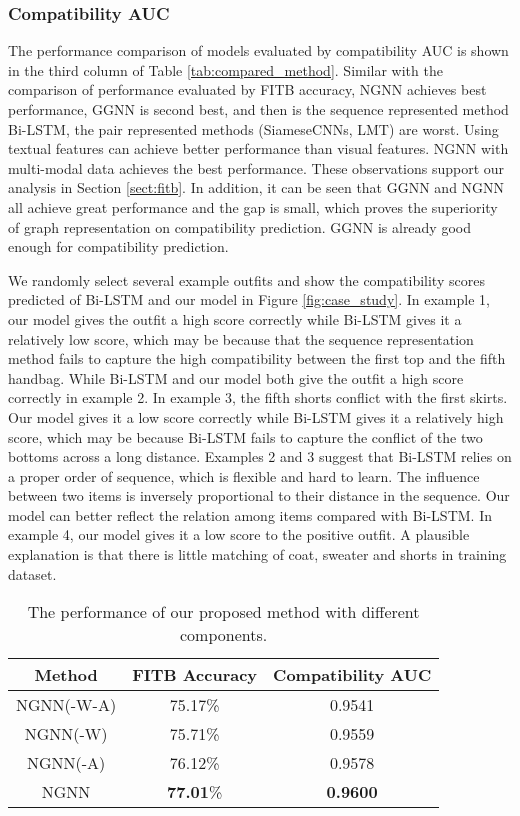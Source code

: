 \documentclass[sigconf]{acmart}
\begin{document}
\subsubsection{Compatibility AUC}
The performance comparison of models evaluated by compatibility AUC is shown in the third column of Table \ref{tab:compared_method}.
Similar with the comparison of performance evaluated by FITB accuracy, NGNN achieves best performance, GGNN is second best, and then is the sequence represented method Bi-LSTM, the pair represented methods (SiameseCNNs, LMT) are worst. Using textual features can achieve better performance than visual features. NGNN with multi-modal data achieves the best performance. These observations support our analysis in Section \ref{sect:fitb}.
In addition, it can be seen that GGNN and NGNN all achieve great performance and the gap is small, which proves the superiority of graph representation on compatibility prediction.
GGNN is already good enough for compatibility prediction.


We randomly select several example outfits and show the compatibility scores predicted of Bi-LSTM and our model in Figure \ref{fig:case_study}.
In example 1, our model gives the outfit a high score correctly while Bi-LSTM gives it a relatively low score, which may be because that the sequence representation method fails to capture the high compatibility between the first top and the fifth handbag.
While Bi-LSTM and our model both give the outfit a high score correctly in example 2.
In example 3, the fifth shorts conflict with the first skirts. Our model gives it a low score correctly while Bi-LSTM gives it a relatively high score, which may be because Bi-LSTM fails to capture the conflict of the two bottoms across a long distance. Examples 2 and 3 suggest that Bi-LSTM relies on a proper order of sequence, which is flexible and hard to learn. The influence between two items is inversely proportional to their distance in the sequence. Our model can better reflect the relation among items compared with Bi-LSTM.
In example 4, our model gives it a low score to the positive outfit. A plausible explanation is that there is little matching of coat, sweater and shorts in training dataset.


\begin{table}[htbp]
  \centering
  \caption{The performance of our proposed method with different components.}
    \begin{tabular}{ccc}
    \toprule
    Method & FITB Accuracy  &  Compatibility AUC \\
\midrule
    NGNN(-W-A)& 75.17\%   & 0.9541 \\
    NGNN(-W)& 75.71\%  & 0.9559\\
    NGNN(-A)& 76.12\%   & 0.9578 \\
    NGNN& \textbf{77.01}\%  & \textbf{0.9600} \\
    \bottomrule
    \end{tabular}\label{tab:ablation}\end{table}
\end{document}
